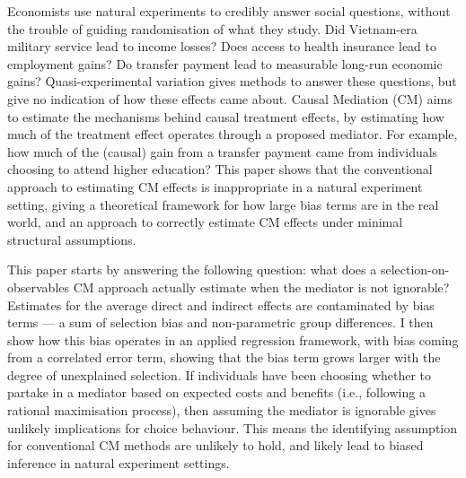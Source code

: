 Economists use natural experiments to credibly answer social questions, without the trouble of guiding randomisation of what they study.
Did Vietnam-era military service lead to income losses?
Does access to health insurance lead to employment gains?
Do transfer payment  lead to measurable long-run economic gains?
Quasi-experimental variation gives methods to answer these questions, but give no indication of how these effects came about.
Causal Mediation (CM) aims to estimate the mechanisms behind causal treatment effects, by estimating how much of the treatment effect operates through a proposed mediator.
For example, how much of the (causal) gain from a transfer payment came from individuals choosing to attend higher education?
This paper shows that the conventional approach to estimating CM effects is inappropriate in a natural experiment setting, giving a theoretical framework for how large bias terms are in the real world, and an approach to correctly estimate CM effects under minimal structural assumptions.

This paper starts by answering the following question: what does a selection-on-observables CM approach actually estimate when the mediator is not ignorable?
Estimates for the average direct and indirect effects are contaminated by bias terms --- a sum of selection bias and non-parametric group differences.
I then show how this bias operates in an applied regression framework, with bias coming from a correlated error term, showing that the bias term grows larger with the degree of unexplained selection.
If individuals have been choosing whether to partake in a mediator based on expected costs and benefits (i.e., following a rational maximisation process), then assuming the mediator is ignorable gives unlikely implications for choice behaviour.
This means the identifying assumption for conventional CM methods are unlikely to hold, and likely lead to biased inference in natural experiment settings.

